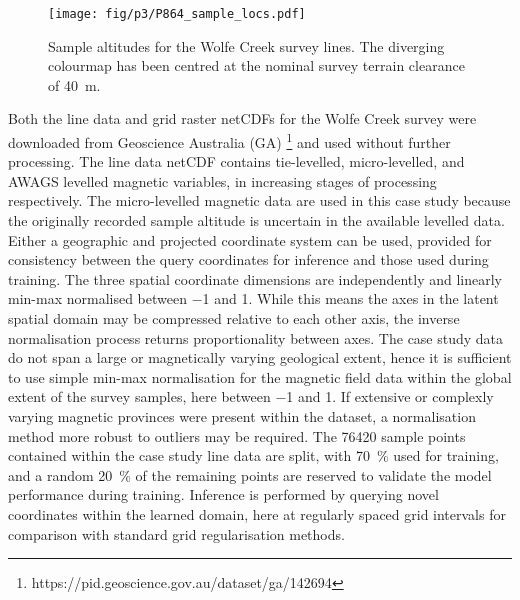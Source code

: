 \begin{figure}[hbtp]
    \centering{}
    \texttt{[image: fig/p3/P864\_sample\_locs.pdf]}
    \caption[Point samples]{Sample altitudes for the Wolfe Creek survey lines. The diverging colourmap has been centred at the nominal survey terrain clearance of \qty{40}{\m}.}
    \label{fig:samples}
\end{figure}

Both the line data and grid raster netCDFs for the Wolfe Creek survey were downloaded from Geoscience Australia (GA) \footnote{https://pid.geoscience.gov.au/dataset/ga/142694} and used without further processing.
The line data netCDF contains tie-levelled, micro-levelled, and AWAGS levelled magnetic variables, in increasing stages of processing respectively.
The micro-levelled magnetic data are used in this case study because the originally recorded sample altitude is uncertain in the available levelled data.
Either a geographic and projected coordinate system can be used, provided for consistency between the query coordinates for inference and those used during training.
The three spatial coordinate dimensions are independently and linearly min-max normalised between \num{-1} and \num{1}.
While this means the axes in the latent spatial domain may be compressed relative to each other axis, the inverse normalisation process returns proportionality between axes.
The case study data do not span a large or magnetically varying geological extent, hence it is sufficient to use simple min-max normalisation for the magnetic field data within the global extent of the survey samples, here between \num{-1} and \num{1}.
If extensive or complexly varying magnetic provinces were present within the dataset, a normalisation method more robust to outliers may be required.
The \num{76420} sample points contained within the case study line data are split, with \qty{70}{\percent} used for training, and a random \qty{20}{\percent} of the remaining points are reserved to validate the model performance during training.
Inference is performed by querying novel coordinates within the learned domain, here at regularly spaced grid intervals for comparison with standard grid regularisation methods.

